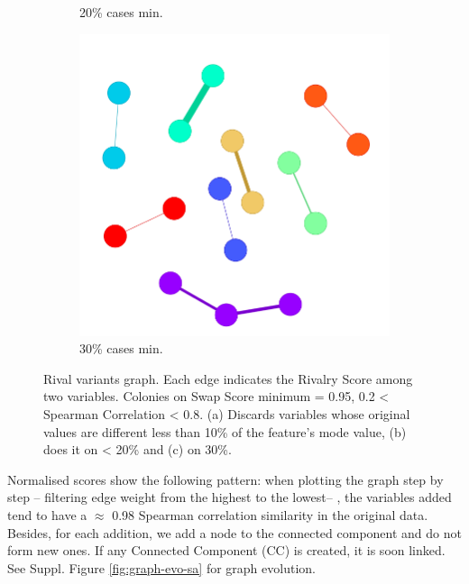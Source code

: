 \begin{figure}[!ht]
\begin{subfigure}[b]{0.30\linewidth}
		\caption{20\% cases min.}
	\end{subfigure}
	\hfill
	\begin{subfigure}[b]{0.30\linewidth}
		\includegraphics[width=\linewidth]{Minor Thesis/figures/graphs/main/g95302028.png}
		\caption{30\% cases min.}
	\end{subfigure}
	\hfill
    \caption{Rival variants graph. Each edge indicates the Rivalry Score among two variables. Colonies on Swap Score minimum = 0.95, 0.2 < Spearman Correlation < 0.8. (a) Discards variables whose original values are different less than 10\% of the feature's mode value, (b) does it on < 20\% and (c) on 30\%.}
    \label{fig:main-graphs}
\end{figure}

Normalised scores show the following pattern: when plotting the graph step by step -- filtering edge weight from the highest to the lowest-- , the variables added tend to have a $\approx$ 0.98 Spearman correlation similarity in the original data. Besides, for each addition, we add a node to the connected component and do not form new ones. If any Connected Component (CC) is created, it is soon linked. See Suppl. Figure \ref{fig:graph-evo-sa} for graph evolution.
\\


